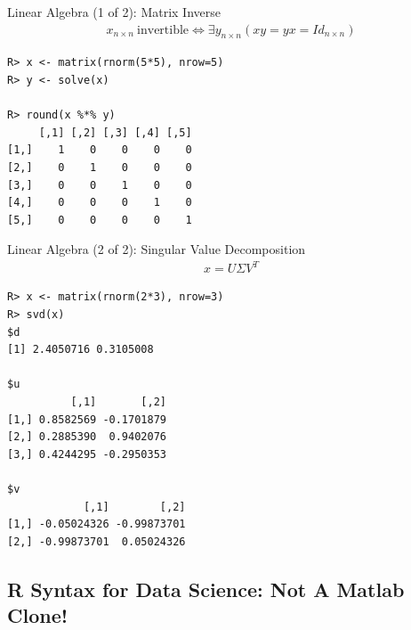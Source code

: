 \begin{frame}[fragile]
  \begin{exampleblock}{Linear Algebra (1 of 2): Matrix Inverse}\pause
  \begin{align*}
    x_{n\times n}\ \text{invertible} \iff \exists y_{n\times n} \left( xy = yx = 
Id_{n\times n} \right)
  \end{align*}
\begin{lstlisting}[backgroundcolor=\color{white},basicstyle=\ttfamily\color{
dkgray}\scriptsize,keywordstyle=\color{black}, 
  commentstyle=\color{orange},stringstyle=\color{mauve}]
R> x <- matrix(rnorm(5*5), nrow=5)
R> y <- solve(x)

R> round(x %*% y)
     [,1] [,2] [,3] [,4] [,5]
[1,]    1    0    0    0    0
[2,]    0    1    0    0    0
[3,]    0    0    1    0    0
[4,]    0    0    0    1    0
[5,]    0    0    0    0    1
\end{lstlisting}
  \end{exampleblock}
\end{frame}



\begin{frame}
  \begin{exampleblock}{Linear Algebra (2 of 2): Singular Value 
Decomposition}\pause
  \begin{align*}
    x = U\Sigma V^T
  \end{align*}
\begin{lstlisting}[backgroundcolor=\color{white},basicstyle=\ttfamily\color{
dkgray}\scriptsize,keywordstyle=\color{black}, 
  commentstyle=\color{orange},stringstyle=\color{mauve}]
R> x <- matrix(rnorm(2*3), nrow=3)
R> svd(x)
$d
[1] 2.4050716 0.3105008

$u
          [,1]       [,2]
[1,] 0.8582569 -0.1701879
[2,] 0.2885390  0.9402076
[3,] 0.4244295 -0.2950353

$v
            [,1]        [,2]
[1,] -0.05024326 -0.99873701
[2,] -0.99873701  0.05024326

\end{lstlisting} %
  \end{exampleblock}
\end{frame}





\subsection{R Syntax for Data Science:  Not A Matlab Clone!}

